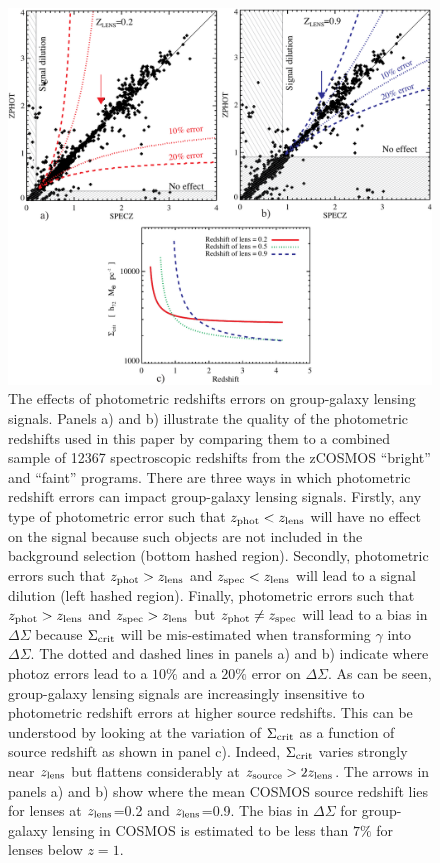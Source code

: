 \documentclass[12pt]{emulateapj}
\begin{document}
\begin{figure}[htb]
\centerline{\includegraphics[scale=0.56]{figure8.pdf}}
\caption{The effects of photometric redshifts errors on group-galaxy
  lensing signals. Panels a) and b) illustrate the quality of the
  photometric redshifts used in this paper by comparing them to a
  combined sample of 12367 spectroscopic redshifts from the zCOSMOS
  ``bright'' and ``faint'' programs. There are three ways in which
  photometric redshift errors can impact group-galaxy lensing
  signals. Firstly, any type of photometric error such that $z_{\rm
    phot}<z_{\rm lens}$ will have no effect on the signal because such
  objects are not included in the background selection (bottom hashed
  region). Secondly, photometric errors such that $z_{\rm phot}>z_{\rm
    lens}$ and $z_{\rm spec}<z_{\rm lens}$ will lead to a signal
  dilution (left hashed region). Finally, photometric errors such that
  $z_{\rm phot}>z_{\rm lens}$ and $z_{\rm spec}>z_{\rm lens}$ but
  $z_{\rm phot}\neq z_{\rm spec}$ will lead to a bias in
  $\Delta\Sigma$ because $\Sigma_{\rm crit}$ will be mis-estimated
  when transforming $\gamma$ into $\Delta\Sigma$. The dotted and
  dashed lines in panels a) and b) indicate where photoz errors lead to
  a $10\%$ and a $20\%$ error on $\Delta\Sigma$. As can be seen,
  group-galaxy lensing signals are increasingly insensitive to
  photometric redshift errors at higher source redshifts. This can be
  understood by looking at the variation of $\Sigma_{\rm crit}$ as a
  function of source redshift as shown in panel c). Indeed,
  $\Sigma_{\rm crit}$ varies strongly near $z_{\rm lens}$ but flattens
  considerably at $z_{\rm source}>2 z_{\rm lens}$. The arrows in
  panels a) and b) show where the mean COSMOS source redshift lies for
  lenses at $z_{\rm lens}$=0.2 and $z_{\rm lens}$=0.9. The bias in
  $\Delta\Sigma$ for group-galaxy lensing in COSMOS is estimated to be
  less than $7\%$ for lenses below $z=1$.}
\label{redshift_systematics}
\end{figure}
\end{document}
